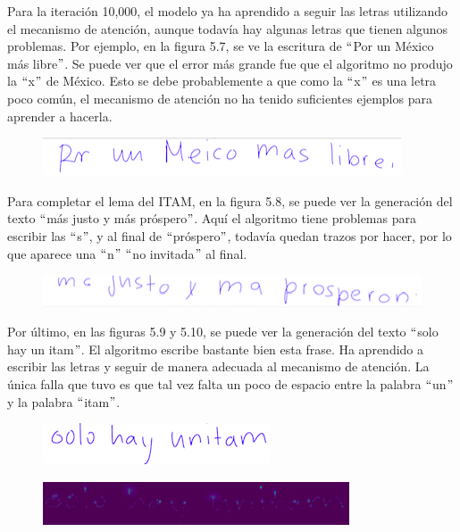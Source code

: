 Para la iteración 10,000, el modelo ya ha aprendido a seguir las letras utilizando el mecanismo de atención, aunque todavía hay algunas letras que tienen algunos problemas. Por ejemplo, en la figura 5.7, se ve la escritura de $``$Por un México más libre$"$. Se puede ver que el error más grande fue que el algoritmo no produjo la $``$x$"$ de México. Esto se debe probablemente a que como la $``$x$"$ es una letra poco común, el mecanismo de atención no ha tenido suficientes ejemplos para aprender a hacerla.

\begin{figure}[htbp]
\begin{center}
\includegraphics{./imag/por_un_10000.png}
\end{center}
\caption{}
\end{figure}

Para completar el lema del ITAM, en la figura 5.8, se puede ver la generación del texto $``$más justo y más próspero$"$. Aquí el algoritmo tiene problemas para escribir las $``$s$"$, y al final de $``$próspero$"$, todavía quedan trazos por hacer, por lo que aparece una $``$n$"$ $``$no invitada$"$ al final.

\begin{figure}[htbp]
\begin{center}
\includegraphics{./imag/justo10000.png}
\end{center}
\caption{}
\end{figure}

\vspace{3em}

Por último, en las figuras 5.9 y 5.10, se puede ver la generación del texto $``$solo hay un itam$"$. El algoritmo escribe bastante bien esta frase. Ha aprendido a escribir las letras y seguir de manera adecuada al mecanismo de atención.  La única falla que tuvo es que tal vez falta un poco de espacio entre la palabra $``$un$"$ y la palabra $``$itam$"$.

\begin{figure}[htbp]
\begin{center}
\includegraphics{./imag/solo4.png}
\end{center}
\caption{}
\end{figure}
\begin{figure}[htbp]
\begin{center}
\includegraphics{./imag/solo5.png}
\end{center}
\caption{}
\end{figure}

